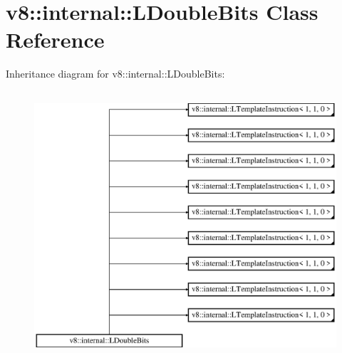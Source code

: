 \hypertarget{classv8_1_1internal_1_1_l_double_bits}{}\section{v8\+:\+:internal\+:\+:L\+Double\+Bits Class Reference}
\label{classv8_1_1internal_1_1_l_double_bits}
Inheritance diagram for v8\+:\+:internal\+:\+:L\+Double\+Bits\+:\begin{figure}[H]
\begin{center}
\leavevmode
\includegraphics[height=10.000000cm]{classv8_1_1internal_1_1_l_double_bits}
\end{center}
\end{figure}
